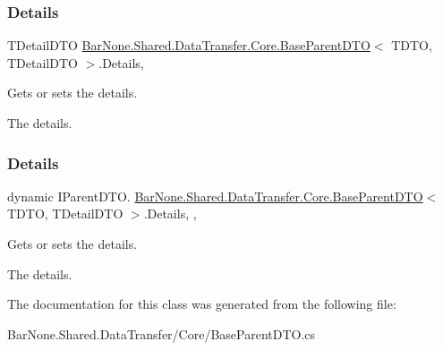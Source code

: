 \subsubsection{\texorpdfstring{Details}{Details}\hspace{0.1cm}{\footnotesize\ttfamily [1/2]}}
{\footnotesize\ttfamily T\+Detail\+D\+TO \mbox{\hyperlink{class_bar_none_1_1_shared_1_1_data_transfer_1_1_core_1_1_base_parent_d_t_o}{Bar\+None.\+Shared.\+Data\+Transfer.\+Core.\+Base\+Parent\+D\+TO}}$<$ T\+D\+TO, T\+Detail\+D\+TO $>$.Details\hspace{0.3cm}{\ttfamily [get]}, {\ttfamily [set]}}



Gets or sets the details. 

The details. \mbox{\label{class_bar_none_1_1_shared_1_1_data_transfer_1_1_core_1_1_base_parent_d_t_o_a1a156f067a313c34939213ca31d2f869}} 
\subsubsection{\texorpdfstring{Details}{Details}\hspace{0.1cm}{\footnotesize\ttfamily [2/2]}}
{\footnotesize\ttfamily dynamic I\+Parent\+D\+T\+O. \mbox{\hyperlink{class_bar_none_1_1_shared_1_1_data_transfer_1_1_core_1_1_base_parent_d_t_o}{Bar\+None.\+Shared.\+Data\+Transfer.\+Core.\+Base\+Parent\+D\+TO}}$<$ T\+D\+TO, T\+Detail\+D\+TO $>$.Details\hspace{0.3cm}{\ttfamily [get]}, {\ttfamily [set]}, {\ttfamily [private]}}



Gets or sets the details. 

The details. 

The documentation for this class was generated from the following file\+:\begin{DoxyCompactItemize}
\item 
Bar\+None.\+Shared.\+Data\+Transfer/\+Core/Base\+Parent\+D\+T\+O.\+cs\end{DoxyCompactItemize}
